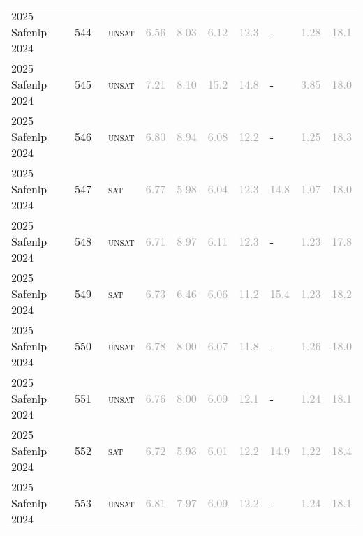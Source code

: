 \begin{center}
{\begin{longtable}{@{}llllllllll@{}}
2025 Safenlp 2024 & 544 & ~\textsc{unsat} & \textcolor{darkgray}{6.56} & \textcolor{darkgray}{8.03} & \textcolor{darkgray}{6.12} & \textcolor{darkgray}{12.3} & - & \textcolor{darkgray}{1.28} & \textcolor{darkgray}{18.1} \\
2025 Safenlp 2024 & 545 & ~\textsc{unsat} & \textcolor{darkgray}{7.21} & \textcolor{darkgray}{8.10} & \textcolor{darkgray}{15.2} & \textcolor{darkgray}{14.8} & - & \textcolor{darkgray}{3.85} & \textcolor{darkgray}{18.0} \\
2025 Safenlp 2024 & 546 & ~\textsc{unsat} & \textcolor{darkgray}{6.80} & \textcolor{darkgray}{8.94} & \textcolor{darkgray}{6.08} & \textcolor{darkgray}{12.2} & - & \textcolor{darkgray}{1.25} & \textcolor{darkgray}{18.3} \\
2025 Safenlp 2024 & 547 & ~\textsc{sat} & \textcolor{darkgray}{6.77} & \textcolor{darkgray}{5.98} & \textcolor{darkgray}{6.04} & \textcolor{darkgray}{12.3} & \textcolor{darkgray}{14.8} & \textcolor{darkgray}{1.07} & \textcolor{darkgray}{18.0} \\
2025 Safenlp 2024 & 548 & ~\textsc{unsat} & \textcolor{darkgray}{6.71} & \textcolor{darkgray}{8.97} & \textcolor{darkgray}{6.11} & \textcolor{darkgray}{12.3} & - & \textcolor{darkgray}{1.23} & \textcolor{darkgray}{17.8} \\
2025 Safenlp 2024 & 549 & ~\textsc{sat} & \textcolor{darkgray}{6.73} & \textcolor{darkgray}{6.46} & \textcolor{darkgray}{6.06} & \textcolor{darkgray}{11.2} & \textcolor{darkgray}{15.4} & \textcolor{darkgray}{1.23} & \textcolor{darkgray}{18.2} \\
2025 Safenlp 2024 & 550 & ~\textsc{unsat} & \textcolor{darkgray}{6.78} & \textcolor{darkgray}{8.00} & \textcolor{darkgray}{6.07} & \textcolor{darkgray}{11.8} & - & \textcolor{darkgray}{1.26} & \textcolor{darkgray}{18.0} \\
2025 Safenlp 2024 & 551 & ~\textsc{unsat} & \textcolor{darkgray}{6.76} & \textcolor{darkgray}{8.00} & \textcolor{darkgray}{6.09} & \textcolor{darkgray}{12.1} & - & \textcolor{darkgray}{1.24} & \textcolor{darkgray}{18.1} \\
2025 Safenlp 2024 & 552 & ~\textsc{sat} & \textcolor{darkgray}{6.72} & \textcolor{darkgray}{5.93} & \textcolor{darkgray}{6.01} & \textcolor{darkgray}{12.2} & \textcolor{darkgray}{14.9} & \textcolor{darkgray}{1.22} & \textcolor{darkgray}{18.4} \\
2025 Safenlp 2024 & 553 & ~\textsc{unsat} & \textcolor{darkgray}{6.81} & \textcolor{darkgray}{7.97} & \textcolor{darkgray}{6.09} & \textcolor{darkgray}{12.2} & - & \textcolor{darkgray}{1.24} & \textcolor{darkgray}{18.1} \\

\end{longtable}}
\end{center}
